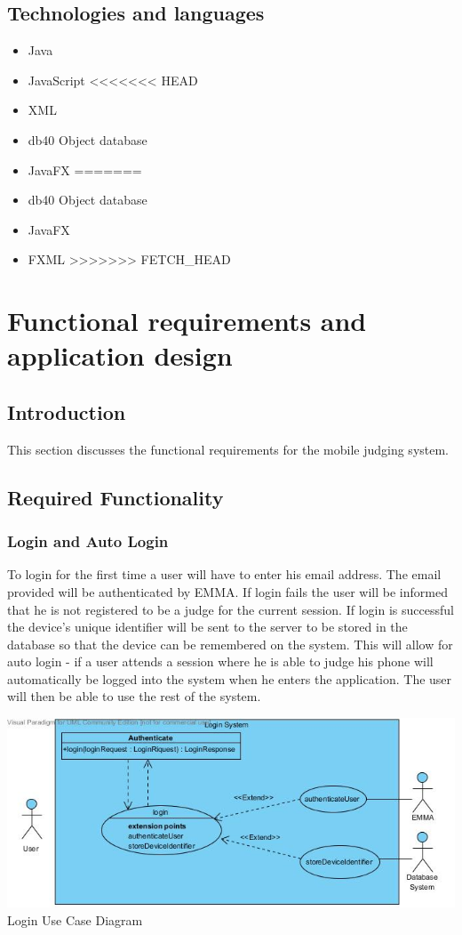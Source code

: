 \documentclass[10pt,a4paper]{article}
\begin{document}
\subsection{Technologies and languages}
\begin{itemize}
\item Java
\item JavaScript
<<<<<<< HEAD
\item XML
\item db40 Object database
\item JavaFX
=======
\item db40 Object database
\item JavaFX
\item FXML
>>>>>>> FETCH_HEAD
\end{itemize}

\pagebreak
\section{Functional requirements and application design}
\subsection{Introduction}
This section discusses the functional requirements for the mobile judging system.
\subsection{Required Functionality}
\subsubsection{Login and Auto Login}
To login for the first time a user will have to enter his email address. The email provided will be authenticated by EMMA. If login fails the user will be informed that he is not registered to be a judge for the current session. If login is successful the device's unique identifier will be sent to the server to be stored in the database so that the device can be remembered on the system. This will allow for auto login - if a user attends a session where he is able to judge his phone will automatically be logged into the system when he enters the application. The user will then be able to use the rest of the system.

\begin{center}
\advance\leftskip-1.3cm
\includegraphics[width=160mm]{Pictures/Login.jpg} 
Login Use Case Diagram 
\end{center}
\end{document}
